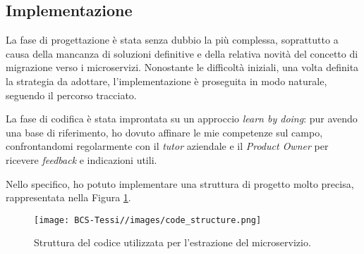         
        \subsection{Implementazione}
        La fase di progettazione è stata senza dubbio la più complessa, soprattutto a causa della mancanza di soluzioni definitive e della relativa novità del concetto di migrazione verso i microservizi. Nonostante le difficoltà iniziali, una volta definita la strategia da adottare, l’implementazione è proseguita in modo naturale, seguendo il percorso tracciato.  

        \vspace{0.2 em}
        \noindent La fase di codifica è stata improntata su un approccio \textit{learn by doing}: pur avendo una base di riferimento, ho dovuto affinare le mie competenze sul campo, confrontandomi regolarmente con il \textit{tutor} aziendale e il \textit{Product Owner} per ricevere \textit{feedback} e indicazioni utili.
        
        \noindent Nello specifico, ho potuto implementare una struttura di progetto molto precisa, rappresentata nella Figura \ref{fig:code-structure}.

         
        \begin{figure}
            \centering
            \texttt{[image: BCS-Tessi//images/code\_structure.png]}
            \caption{Struttura del codice utilizzata per l'estrazione del microservizio.}
            \label{fig:code-structure}
        \end{figure}

